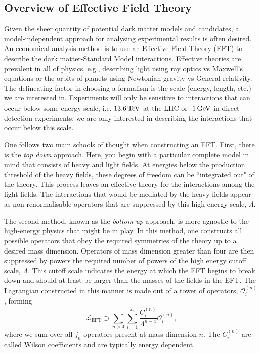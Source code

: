 \subsection{Overview of Effective Field Theory}
Given the sheer quantity of potential dark matter models and candidates, a model-independent approach for analysing experimental results is often desired. An economical analysis method is to use an Effective Field Theory (EFT) to describe the dark matter-Standard Model interactions. Effective theories are prevalent in all of physics, e.g., describing light using ray optics vs Maxwell's equations or the orbits of planets using Newtonian gravity vs General relativity. The delineating factor in choosing a formalism is the scale (energy, length, etc.) we are interested in. 
Experiments will only be sensitive to interactions that can occur below some energy scale, i.e. $13.6{\rm \,TeV}$ at the LHC or $~1{\rm \,GeV}$ in direct detection experiments; we are only interested in describing the interactions that occur below this scale.

One follows two main schools of thought when constructing an EFT. First, there is the \textit{top down} approach. Here, you begin with a particular complete model in mind that consists of heavy and light fields. At energies below the production threshold of the heavy fields, these degrees of freedom can be ``integrated out" of the theory. This process leaves an effective theory for the interactions among the light fields. The interactions that would be mediated by the heavy fields appear as non-renormalisable operators that are suppressed by this high energy scale, $\Lambda$. 

The second method, known as the \textit{bottom-up} approach, is more agnostic to the high-energy physics that might be in play. In this method, one constructs all possible operators that obey the required symmetries of the theory up to a desired mass dimension. Operators of mass dimension greater than four are then suppressed by powers the required number of powers of the high energy cutoff scale, $\Lambda$. This cutoff scale indicates the energy at which the EFT begins to break down and should at least be larger than the masses of the fields in the EFT. The Lagrangian constructed in this manner is made out of a tower of operators, $\mathcal{O}_i^{(n)}$, forming
\begin{equation}
    \mathcal{L}_\mathrm{EFT} \supset \sum_{n>4}   \sum_{i = 1}^{j_n} \frac{C_i^{(n)}}{\Lambda^{n-4}}\mathcal{O}_i^{(n)},
\end{equation}
where we sum over all $j_n$ operators present at mass dimension $n$. The $C_i^{(n)}$ are called Wilson coefficients and are typically energy dependent.


